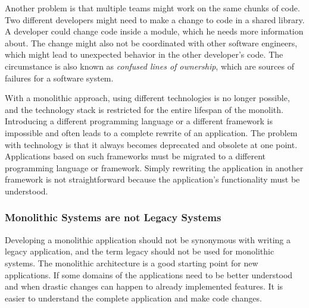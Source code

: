 \bigskip

\noindent Another problem is that multiple teams might work on the same chunks of code. Two different developers might need to make a change to code in a shared library. A developer could change code inside a module, which he needs more information about. The change might also not be coordinated with other software engineers, which might lead to unexpected behavior in the other developer's code. The circumstance is also known as \textit{confused lines of ownership}, which are sources of failures for a software system. \cite[15]{book:2019:newman:background:monolith:monolith-to-microservices} \cite[7]{inproceedings:2011:bird:background:monoliths:dont-touch-my-code}

\bigskip

\noindent With a monolithic approach, using different technologies is no longer possible, and the technology stack is restricted for the entire lifespan of the monolith. Introducing a different programming language or a different framework is impossible and often leads to a complete rewrite of an application. \cite[6-7]{book:2018:richardson:background:bff:microservices-patterns} The problem with technology is that it always becomes deprecated and obsolete at one point. Applications based on such frameworks must be migrated to a different programming language or framework. Simply rewriting the application in another framework is not straightforward because the application's functionality must be understood.

\subsubsection{Monolithic Systems are not Legacy Systems}\label{subsection:background:software-monolith:not-legacy-systems}

Developing a monolithic application should not be synonymous with writing a legacy application, and the term legacy should not be used for monolithic systems. \cite[15]{book:2019:newman:background:monolith:monolith-to-microservices} The monolithic architecture is a good starting point for new applications. If some domains of the applications need to be better understood and when drastic changes can happen to already implemented features. It is easier to understand the complete application and make code changes. \cite[43]{book:2019:newman:background:monolith:monolith-to-microservices}
